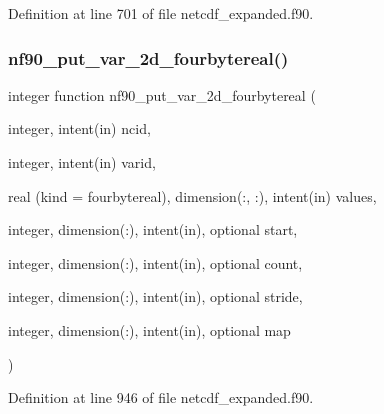 Definition at line 701 of file netcdf\+\_\+expanded.\+f90.

\mbox{\label{netcdf__expanded_8f90_a337f060e87771626a4c6407126fffc0e}} 
\subsubsection{\texorpdfstring{nf90\+\_\+put\+\_\+var\+\_\+2d\+\_\+fourbytereal()}{nf90\_put\_var\_2d\_fourbytereal()}}
{\footnotesize\ttfamily integer function nf90\+\_\+put\+\_\+var\+\_\+2d\+\_\+fourbytereal (\begin{DoxyParamCaption}\item[{integer, intent(in)}]{ncid,  }\item[{integer, intent(in)}]{varid,  }\item[{real (kind = fourbytereal), dimension(\+:, \+:), intent(in)}]{values,  }\item[{integer, dimension(\+:), intent(in), optional}]{start,  }\item[{integer, dimension(\+:), intent(in), optional}]{count,  }\item[{integer, dimension(\+:), intent(in), optional}]{stride,  }\item[{integer, dimension(\+:), intent(in), optional}]{map }\end{DoxyParamCaption})}



Definition at line 946 of file netcdf\+\_\+expanded.\+f90.

\mbox{\label{netcdf__expanded_8f90_a53281f8feb61d247d7abff52eceef05e}} 
